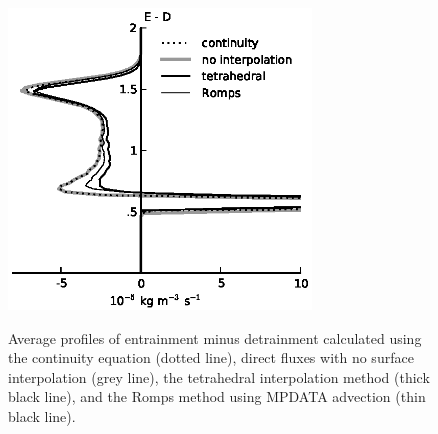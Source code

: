 \documentclass[12pt]{article}
\begin{document}
\begin{figure}[t]
  \noindent
  \includegraphics[width=19pc,angle=0]{./figures/E_minus_D}\\
  \caption{Average profiles of entrainment minus detrainment calculated using 
  the continuity equation (dotted line), direct fluxes with no surface 
  interpolation (grey line), the tetrahedral interpolation method (thick black 
  line), and the Romps method using MPDATA advection (thin black line).
  }\label{fig:E_minus_D}
\end{figure}
\end{document}
